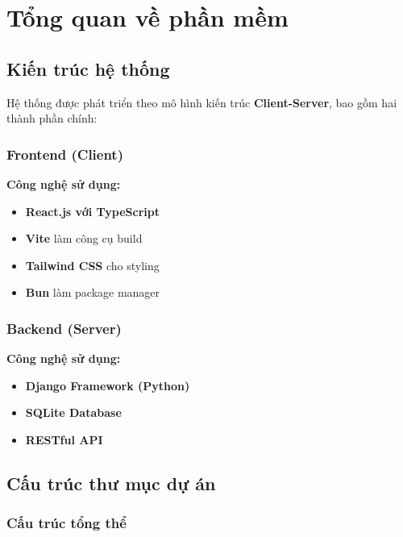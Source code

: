 \documentclass{book}
\let\oldsection\section
\renewcommand{\section}{\clearpage\oldsection}
\begin{document}
\thispagestyle{empty}

\newpage
\tableofcontents
\newpage




\chapter{Tổng quan về phần mềm}

\section{Kiến trúc hệ thống}

Hệ thống được phát triển theo mô hình kiến trúc \textbf{Client-Server}, bao gồm hai thành phần chính:

\subsection{Frontend (Client)}
\textbf{Công nghệ sử dụng:}
\begin{itemize}
    \item \textbf{React.js với TypeScript}
    \item \textbf{Vite} làm công cụ build
    \item \textbf{Tailwind CSS} cho styling
    \item \textbf{Bun} làm package manager
\end{itemize}

\subsection{Backend (Server)}
\textbf{Công nghệ sử dụng:}
\begin{itemize}
    \item \textbf{Django Framework (Python)}
    \item \textbf{SQLite Database}
    \item \textbf{RESTful API}
\end{itemize}

\section{Cấu trúc thư mục dự án}

\subsection{Cấu trúc tổng thể}
\end{document}

